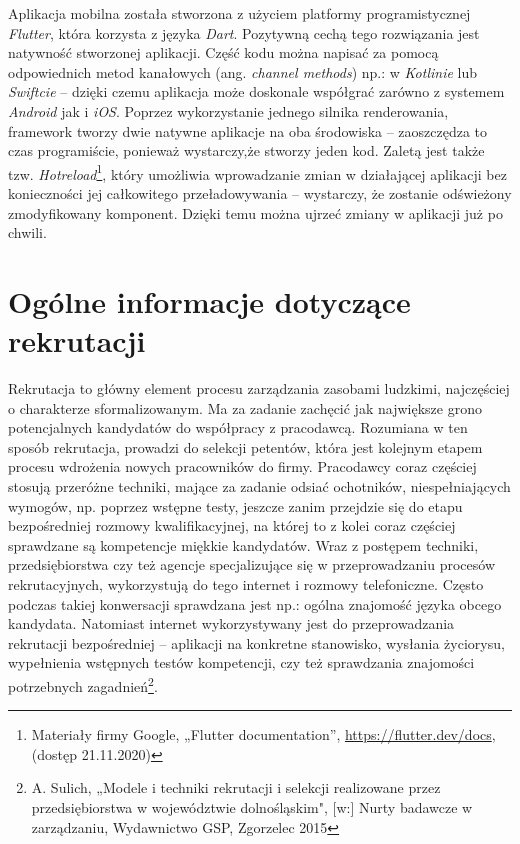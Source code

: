 \documentclass[twoside]{projektInzynierskiMS}
\numberwithin{figure}{section}
\begin{document}
Aplikacja mobilna została stworzona z użyciem platformy programistycznej \textit{Flutter}, która korzysta z języka \textit{Dart}. Pozytywną cechą tego rozwiązania jest natywność stworzonej aplikacji. Część kodu można napisać za pomocą odpowiednich metod kanałowych (ang. \textit{channel methods}) np.: w \textit{Kotlinie} lub \textit{Swiftcie} – dzięki czemu aplikacja może doskonale współgrać zarówno z systemem \textit{Android} jak i \textit{iOS}. Poprzez wykorzystanie jednego silnika renderowania, framework tworzy dwie natywne aplikacje na oba środowiska – zaoszczędza to czas programiście, ponieważ wystarczy,\linebreak że stworzy jeden kod. Zaletą jest także tzw. \textit{Hotreload}\footnote{Materiały firmy Google, „Flutter documentation”,\newline
\url{https://flutter.dev/docs}, (dostęp 21.11.2020)}, który umożliwia wprowadzanie zmian w działającej aplikacji bez konieczności jej całkowitego przeładowywania – wystarczy, że zostanie odświeżony zmodyfikowany komponent. Dzięki temu można ujrzeć zmiany w aplikacji już po chwili.


\section{Ogólne informacje dotyczące rekrutacji}
Rekrutacja to główny element procesu zarządzania zasobami ludzkimi, najczęściej o charakterze sformalizowanym. Ma za zadanie zachęcić jak największe grono potencjalnych kandydatów do współpracy z pracodawcą. Rozumiana w ten sposób rekrutacja, prowadzi do selekcji petentów, która jest kolejnym etapem procesu wdrożenia nowych pracowników do firmy. Pracodawcy coraz częściej stosują przeróżne techniki, mające za zadanie odsiać ochotników, niespełniających wymogów, np. poprzez wstępne testy, jeszcze zanim przejdzie się do etapu bezpośredniej rozmowy kwalifikacyjnej, na której to z kolei coraz częściej sprawdzane są kompetencje miękkie kandydatów. Wraz z postępem techniki, przedsiębiorstwa czy też agencje specjalizujące się w przeprowadzaniu procesów rekrutacyjnych, wykorzystują do tego internet i rozmowy telefoniczne. Często podczas takiej konwersacji sprawdzana jest np.: ogólna znajomość języka obcego kandydata. Natomiast internet wykorzystywany jest do przeprowadzania rekrutacji bezpośredniej – aplikacji na konkretne stanowisko, wysłania życiorysu, wypełnienia wstępnych testów kompetencji, czy też sprawdzania znajomości potrzebnych zagadnień\footnote{A. Sulich, „Modele i techniki rekrutacji i selekcji realizowane przez przedsiębiorstwa w województwie dolnośląskim", [w:] Nurty badawcze w zarządzaniu, Wydawnictwo GSP, Zgorzelec 2015}.
\end{document}
